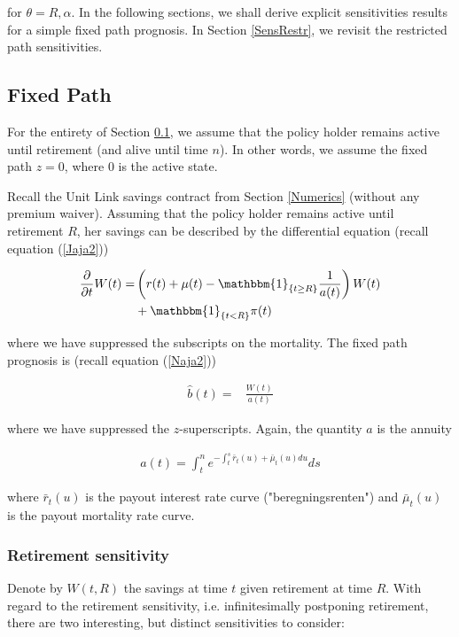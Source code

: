 \documentclass{article}
\newcommand{\1}[1]{\mathbbm{1}_{\left\lbrace #1 \right\rbrace}}
\theoremstyle{break}
\theoremstyle{remark}
\numberwithin{equation}{section}
\begin{document}
for  $\theta = R,\alpha$. In the following sections, we shall derive explicit sensitivities results for a simple fixed path prognosis. In Section \ref{SensRestr}, we revisit the restricted path sensitivities.

\newpage
\subsection{Fixed Path} \label{FixedSens}

For the entirety of Section \ref{FixedSens}, we assume that the policy holder remains active until retirement (and alive until time $n$). In other words, we assume the fixed path $z=0$, where 0 is the active state.

Recall the Unit Link savings contract from Section \ref{Numerics} (without any premium waiver). Assuming that the policy holder remains active until retirement $R$, her savings can be described by the differential equation (recall equation (\ref{Jaja2}))

\begin{align} \label{ReserveDE}
	\begin{split}
		\frac{\partial}{\partial t}W(t) =& \left( r(t) + \mu(t) - \1{t \geq R} \frac{1}{a(t)}\right) W(t) \\
		&+ \1{t<R} \pi(t)
	\end{split}
\end{align}

where we have suppressed the subscripts on the mortality. The fixed path prognosis is (recall equation (\ref{Naja2}))

\begin{align*}
	\hat{b}(t) =& \frac{W(t)}{a(t)}
\end{align*}

where we have suppressed the $z$-superscripts. Again, the quantity $a$ is the annuity

\begin{align*}
	a(t) = \int_t^n e^{-\int_t^s \bar{r}_t(u) + \bar{\mu}_t(u) du} ds
\end{align*}

where $\bar{r}_t(u)$ is the payout interest rate curve ("beregningsrenten") and $\bar{\mu}_t(u)$ is the payout mortality rate curve.

\subsubsection{Retirement sensitivity}

Denote by $W(t,R)$ the savings at time $t$ given retirement at time $R$. With regard to the retirement sensitivity, i.e. infinitesimally postponing retirement, there are two interesting, but distinct sensitivities to consider:
\end{document}
